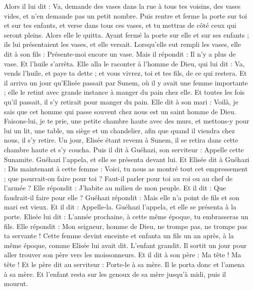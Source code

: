 \begin{multicols}{2}
Alors il lui dit : Va, demande des vases dans la rue à tous tes voisins, des vases vides, et n'en demande pas un petit nombre.
Puis rentre et ferme la porte sur toi et sur tes enfants, et verse dans tous ces vases, et tu mettras de côté ceux qui seront pleins.
Alors elle le quitta. Ayant fermé la porte sur elle et sur ses enfants ; ils lui présentaient les vases, et elle versait.
Lorsqu'elle eut rempli les vases, elle dit à son fils : Présente-moi encore un vase. Mais il répondit : Il n'y a plus de vase. Et l'huile s'arrêta.
Elle alla le raconter à l'homme de Dieu, qui lui dit : Va, vends l'huile, et paye ta dette ; et vous vivrez, toi et tes fils, de ce qui restera.
Et il arriva un jour qu'Elisée passait par Sunem, où il y avait une femme importante ; elle le retint avec grande instance à manger du pain chez elle. Et toutes les fois qu'il passait, il s'y retirait pour manger du pain.
Elle dit à son mari : Voilà, je sais que cet homme qui passe souvent chez nous est un saint homme de Dieu.
Faisons-lui, je te prie, une petite chambre haute avec des murs, et mettons-y pour lui un lit, une table, un siège et un chandelier, afin que quand il viendra chez nous, il s'y retire.
Un jour, Elisée étant revenu à Sunem, il se retira dans cette chambre haute et s'y coucha.
Puis il dit à Guéhazi, son serviteur : Appelle cette Sunamite. Guéhazi l'appela, et elle se présenta devant lui.
Et Elisée dit à Guéhazi : Dis maintenant à cette femme : Voici, tu nous as montré tout cet empressement ; que pourrait-on faire pour toi ? Faut-il parler pour toi au roi ou au chef de l'armée ? Elle répondit : J'habite au milieu de mon peuple.
Et il dit : Que faudrait-il faire pour elle ? Guéhazi répondit : Mais elle n'a point de fils et son mari est vieux.
Et il dit : Appelle-la. Guéhazi l'appela, et elle se présenta à la porte.
Elisée lui dit : L'année prochaine, à cette même époque, tu embrasseras un fils. Elle répondit : Mon seigneur, homme de Dieu, ne trompe pas, ne trompe pas ta servante !
Cette femme devint enceinte et enfanta un fils un an après, à la même époque, comme Elisée lui avait dit.
L'enfant grandit. Il sortit un jour pour aller trouver son père vers les moissonneurs.
Et il dit à son père : Ma tête ! Ma tête ! Et le père dit au serviteur : Porte-le à sa mère.
Il le porta donc et l'amena à sa mère. Et l'enfant resta sur les genoux de sa mère jusqu'à midi, puis il mourut.

\end{multicols}

